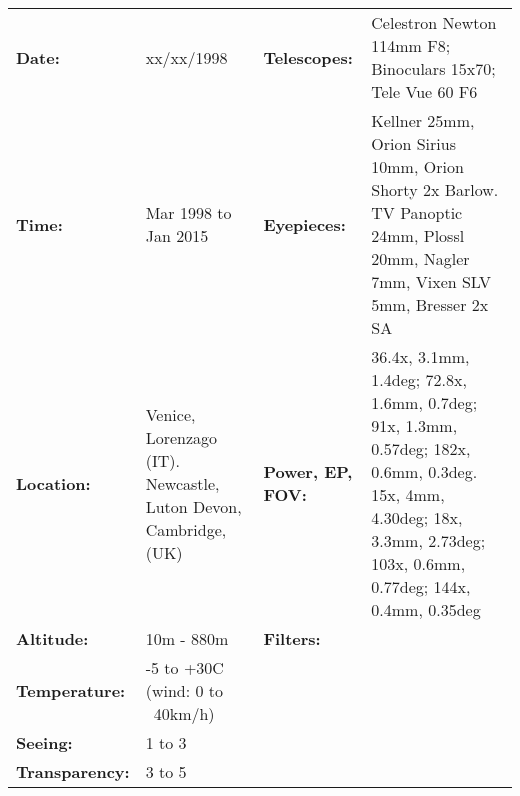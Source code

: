 \begin{tabular}{ p{0.9in} p{1.3in} p{1.2in} p{5.2in}}
{\bf Date:} & xx/xx/1998 & {\bf Telescopes:} & Celestron Newton 114mm F8; Binoculars 15x70; Tele Vue 60 F6 \\ 
{\bf Time:} & Mar 1998 to Jan 2015 & {\bf Eyepieces:} & Kellner 25mm, Orion Sirius 10mm, Orion Shorty 2x Barlow. TV Panoptic 24mm, Plossl 20mm, Nagler 7mm, Vixen SLV 5mm, Bresser 2x SA \\ 
{\bf Location:} & Venice, Lorenzago (IT). Newcastle, Luton Devon, Cambridge, (UK) & {\bf Power, EP, FOV:} & 36.4x, 3.1mm, 1.4deg; 72.8x, 1.6mm, 0.7deg; 91x, 1.3mm, 0.57deg; 182x, 0.6mm, 0.3deg. 15x, 4mm, 4.30deg; 18x, 3.3mm, 2.73deg; 103x, 0.6mm, 0.77deg; 144x, 0.4mm, 0.35deg \\ 
{\bf Altitude:} & 10m - 880m & {\bf Filters:} &  \\ 
{\bf Temperature:} & -5 to +30C (wind: 0 to ~40km/h) & & \\ 
{\bf Seeing:} & 1 to 3 & & \\ 
{\bf Transparency:} & 3 to 5 & & \\ 
\end{tabular}
\centering 
